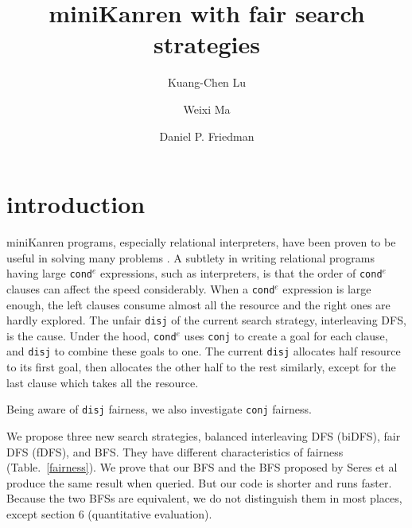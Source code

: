 \documentclass[format=acmlarge, review=true, authordraft=true]{acmart}
\title{miniKanren with fair search strategies}
\author{Kuang-Chen Lu}
\affiliation{Indiana University}
\author{Weixi Ma}
\affiliation{Indiana University}
\author{Daniel P. Friedman}
\affiliation{Indiana University}
\newcommand{\conde}{\texttt{cond$^e$} }
\newcommand{\disj}{\texttt{disj}}
\begin{document}
\begin{abstract}


\end{abstract}

\maketitle

\section{introduction}

miniKanren programs, especially relational interpreters, have been proven to be 
useful in solving many problems \citep{byrd2017unified}. A subtlety in writing 
relational programs having large \conde expressions, such as interpreters, is 
that the order of \conde clauses can affect the speed considerably. When a 
\conde expression is large enough, the left clauses consume almost all the 
resource and the right ones are hardly explored. The unfair \disj{} of the 
current search strategy, interleaving DFS, is the cause. Under the hood, \conde 
uses \texttt{conj} to create a goal for each clause, and \texttt{disj} to 
combine these goals to one. The current \texttt{disj} allocates half resource 
to its first goal, then allocates the other half to the rest similarly, except 
for the last clause which takes all the resource. 

Being aware of \texttt{disj} fairness, we also investigate \texttt{conj} 
fairness. 

We propose three new search strategies, balanced interleaving DFS (biDFS), fair 
DFS (fDFS), and BFS. They have different characteristics of fairness 
(Table.~\ref{fairness}). We prove that our BFS and the BFS proposed by Seres et 
al~\citep{seres1999algebra} produce the same result when queried. But our code 
is shorter and runs faster. Because the two BFSs are equivalent, we do not 
distinguish them in most places, except section 6 (quantitative evaluation).
 
\end{document}
